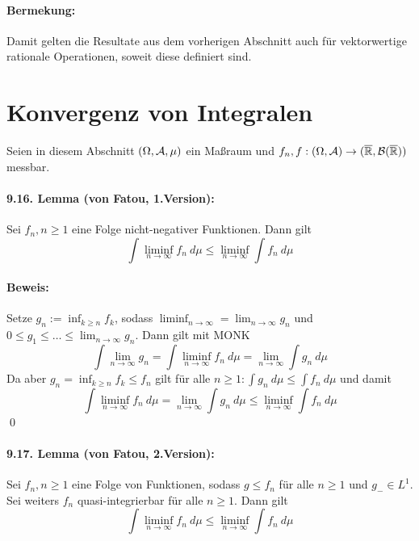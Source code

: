 \paragraph{Bermekung:} Damit gelten die Resultate aus dem vorherigen Abschnitt auch f\"ur vektorwertige rationale Operationen, soweit diese definiert sind.

\section*{Konvergenz von Integralen}
Seien in diesem Abschnitt $(\Omega,\mathcal{A},\mu)$ ein Ma\ss{}raum und $f_n,f:(\Omega,\mathcal{A})\to(\overline{\mathbb{R}},\mathcal{B}(\overline{\mathbb{R}}))$ messbar.

\paragraph{9.16. Lemma (von Fatou, 1.Version):}Sei $f_n,n\geq1$ eine Folge nicht-negativer Funktionen. Dann gilt
$$\int\liminf_{n\to\infty}f_n\ d\mu\leq\liminf_{n\to\infty}\int f_n\ d\mu$$

\paragraph{Beweis:}Setze $g_n:=\inf_{k\geq n}f_k$, sodass $\liminf_{n\to\infty}=\lim_{n\to\infty}g_n$ und $0\leq g_1\leq\hdots\leq \lim_{n\to\infty}g_n$. Dann gilt mit MONK
$$\int\lim_{n\to\infty}g_n=\int\liminf_{n\to\infty}f_n\ d\mu=\lim_{n\to\infty}\int g_n\ d\mu$$
Da aber $g_n=\inf_{k\geq n}f_k\leq f_n$ gilt f\"ur alle $n\geq1:\int g_n\ d\mu\leq\int f_n\ d\mu$
und damit 
$$\int\liminf_{n\to\infty}f_n\ d\mu=\lim_{n\to\infty}\int g_n\ d\mu\leq\liminf_{n\to\infty}\int f_n\ d\mu$$
\qed

\paragraph{9.17. Lemma (von Fatou, 2.Version):}Sei $f_n,n\geq1$ eine Folge von Funktionen, sodass $g\leq f_n$ f\"ur alle $n\geq1$ und $g_-\in L^1$. Sei weiters $f_n$ quasi-integrierbar f\"ur alle $n\geq1$. Dann gilt
$$\int\liminf_{n\to\infty}f_n\ d\mu\leq\liminf_{n\to\infty}\int f_n\ d\mu$$

